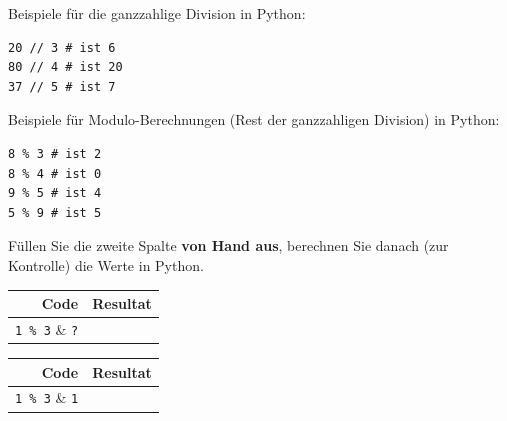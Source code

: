 \begin{myexample}
Beispiele für die ganzzahlige Division in Python:
\begin{lstlisting}
20 // 3 # ist 6
80 // 4 # ist 20
37 // 5 # ist 7
\end{lstlisting}
\end{myexample}

\begin{myexample}
Beispiele für Modulo-Berechnungen (Rest der ganzzahligen Division) in Python:
\begin{lstlisting}
8 % 3 # ist 2
8 % 4 # ist 0
9 % 5 # ist 4
5 % 9 # ist 5
\end{lstlisting}
\end{myexample}

\begin{myexercise}\label{ex:modulo}
	Füllen Sie die zweite Spalte \textbf{von Hand aus}, berechnen Sie danach (zur Kontrolle) die Werte in Python.
	\begin{table}[H]
		\centering
		\begin{tabular}{rc}
			\textbf{Code}     & \textbf{Resultat} \\\midrule
			\lstinline|1 % 3| & \lstinline|?|     \\\midrule
			\lstinline|2 % 3| & \lstinline|?|     \\\midrule
			\lstinline|3 % 3| & \lstinline|?|     \\\midrule
			\lstinline|4 % 3| & \lstinline|?|     \\\midrule
			\lstinline|5 % 3| & \lstinline|?|     \\\midrule
			\lstinline|6 % 3| & \lstinline|?|     \\
		\end{tabular}
	\end{table}
	\begin{myanswer}
		\begin{table}[H]
			\centering
			\begin{tabular}{rc}
				\textbf{Code}     & \textbf{Resultat} \\\midrule
				\lstinline|1 % 3| & \lstinline|1|     \\\midrule
				\lstinline|2 % 3| & \lstinline|2|     \\\midrule
				\lstinline|3 % 3| & \lstinline|0|     \\\midrule
				\lstinline|4 % 3| & \lstinline|1|     \\\midrule
				\lstinline|5 % 3| & \lstinline|2|     \\\midrule
				\lstinline|6 % 3| & \lstinline|0|     \\
			\end{tabular}
		\end{table}
	\end{myanswer}
\end{myexercise}

